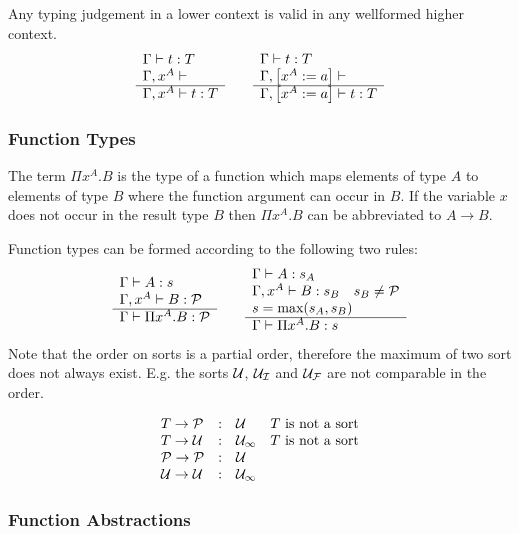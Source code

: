 Any typing judgement in a lower context is valid in any wellformed higher
context.
$$
\begin{array}{l} 
    \Gamma \vdash t : T
    \\
    \Gamma, x^A \vdash
 \\ \hline 
    \Gamma, x^A \vdash t : T
 \end{array}
\quad\quad
\begin{array}{l} 
    \Gamma \vdash t : T
    \\
    \Gamma, \left[ {x^A := a} \right] \vdash
 \\ \hline 
    \Gamma, \left[ {x^A := a} \right] \vdash t : T
 \end{array}
$$





\subsubsection{Function Types}

The term $\Pi x^A.B$ is the type of a function which maps elements of type $A$
to elements of type $B$ where the function argument can occur in $B$. If the
variable $x$ does not occur in the result type $B$ then $\Pi x^A.B$ can be
abbreviated to $A \to B$.

Function types can be formed according to the following two rules:
%
$$
\begin{array}{l} 
    \Gamma \vdash A: s
    \\
    \Gamma, x^A \vdash B: {\mathcal P}
 \\ \hline 
    \Gamma \vdash \Pi x^A. B : {\mathcal P}
 \end{array}
\quad\quad
\begin{array}{l} 
    \Gamma \vdash A: s_A
    \\
    \Gamma, x^A \vdash B: s_B \quad s_B \ne {\mathcal P}
    \\
    s = \text{max}(s_A, s_B)
 \\ \hline 
    \Gamma \vdash \Pi x^A. B : s
 \end{array}
$$
%
Note that the order on sorts is a partial order, therefore the maximum of two
sort does not always exist. E.g. the sorts ${\mathcal U}$, ${{\mathcal U}_\mathcal I}$ and ${{\mathcal U}_\mathcal F}$ are
not comparable in the order.

$$
\begin{array}{lllll} 
    T \to {\mathcal P}     &:&     {\mathcal U}    & T \text{ is not a sort}
    \\
    T \to {\mathcal U}      &:&     {{\mathcal U}_\infty}    & T \text{ is not a sort}
    \\
    {\mathcal P} \to {\mathcal P} &:&     {\mathcal U}
    \\
    {\mathcal U} \to {\mathcal U}   &:&     {{\mathcal U}_\infty}
 \end{array}
$$







\subsubsection{Function Abstractions}


